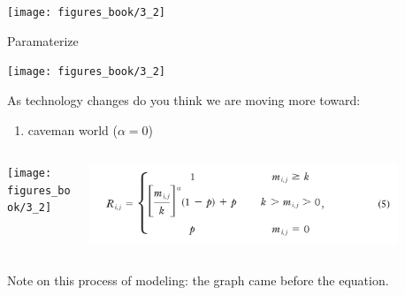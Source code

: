 \documentclass[aspectratio=169]{beamer}
\begin{document}
\begin{frame}

\begin{center}
\texttt{[image: figures\_book/3\_2]}
\end{center}

\vfill
Paramaterize

\end{frame}
\begin{frame}

\vspace{-0.5in}
\begin{center}
\texttt{[image: figures\_book/3\_2]}
\end{center}
\vspace{-0.5in}
As technology changes do you think we are moving more toward:
\begin{enumerate}
\item caveman world ($\alpha = 0$)
\end{enumerate}

\end{frame}
\begin{frame}

\begin{columns}
\begin{column}{0.4\textwidth}
\begin{center}
\texttt{[image: figures\_book/3\_2]}
\end{center}
\end{column}
\begin{column}{0.6\textwidth}
\begin{center}
\includegraphics[width = 0.85\textwidth]{figures/watts_networks_1999_eq5.png}
\end{center}
\end{column}
\end{columns}

\vfill

Note on this process of modeling: the graph came before the equation.
\end{frame}
\end{document}
